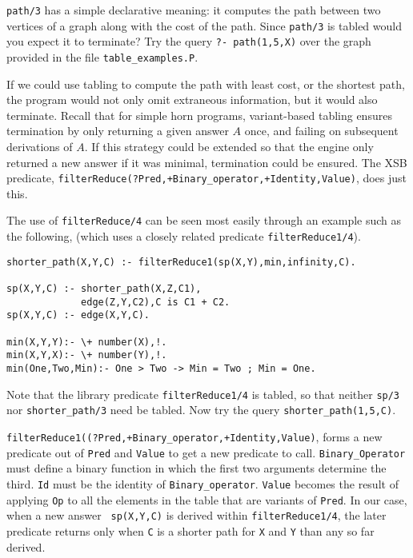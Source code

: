 \begin{exercise}
{\tt path/3} has a simple declarative meaning: it computes the path
between two vertices of a graph along with the cost of the path.
Since {\tt path/3} is tabled would you expect it to terminate?  Try
the query {\tt ?- path(1,5,X)} over the graph provided in the file
{\tt table\_examples.P}.
\end{exercise}

If we could use tabling to compute the path with least cost, or the
shortest path, the program would not only omit extraneous information,
but it would also terminate.  Recall that for simple horn programs,
variant-based tabling ensures termination by only returning a given
answer $A$ once, and failing on subsequent derivations of $A$.  If
this strategy could be extended so that the engine only returned a new
answer if it was minimal, termination could be ensured.  The XSB
predicate, {\tt filterReduce(?Pred,+Binary\_operator,+Identity,Value)},
does just this.  

\begin{exercise}
The use of {\tt filterReduce/4} can be seen most easily through an
example such as the following, (which uses a closely related predicate
{\tt filterReduce1/4}).
\begin{center}
\begin{minipage}{3.8in}
\begin{verbatim}
shorter_path(X,Y,C) :- filterReduce1(sp(X,Y),min,infinity,C).

sp(X,Y,C) :- shorter_path(X,Z,C1),
             edge(Z,Y,C2),C is C1 + C2.
sp(X,Y,C) :- edge(X,Y,C).

min(X,Y,Y):- \+ number(X),!.
min(X,Y,X):- \+ number(Y),!.
min(One,Two,Min):- One > Two -> Min = Two ; Min = One.
\end{verbatim}						       
\end{minipage}
\end{center}
Note that the library predicate {\tt filterReduce1/4} is tabled, so
that neither {\tt sp/3} nor {\tt shorter\_path/3} need be tabled.  Now
try the query {\tt shorter\_path(1,5,C)}.
\end{exercise}

{\tt filterReduce1((?Pred,+Binary\_operator,+Identity,Value)}, forms a
new predicate out of {\tt Pred} and {\tt Value} to get a new predicate
to call.  {\tt Binary\_Operator} must define a binary function in
which the first two arguments determine the third.  {\tt Id} must be
the identity of {\tt Binary\_operator}.  {\tt Value} becomes the
result of applying {\tt Op} to all the elements in the table that are
variants of {\tt Pred}.  In our case, when a new answer {\tt
sp(X,Y,C)} is derived within {\tt filterReduce1/4}, the later
predicate returns only when {\tt C} is a shorter  path for {\tt X} and
{\tt Y} than any so far derived.


